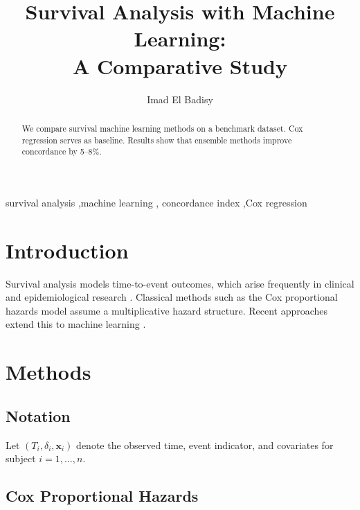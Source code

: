 \documentclass[preprint, 12pt, authoryear]{elsarticle}
\begin{document}
\begin{frontmatter}

\title{Survival Analysis with Machine Learning:\\
       A Comparative Study}

\author[unilab]{Imad El Badisy}


\begin{abstract}
We compare survival machine learning methods on a benchmark
dataset. Cox regression serves as baseline. Results show that
ensemble methods improve concordance by 5--8\%.
\end{abstract}

\begin{keyword}
  survival analysis \sep machine learning \sep
  concordance index \sep Cox regression
\end{keyword}

\end{frontmatter}


\section{Introduction}
\label{sec:intro}

Survival analysis models time-to-event outcomes, which arise
frequently in clinical and epidemiological research
\citep{cox1972}.
Classical methods such as the Cox proportional hazards model
\citep{cox1972} assume a multiplicative hazard structure.
Recent approaches extend this to machine learning
\citep{hastie2009}.

\section{Methods}
\label{sec:methods}

\subsection{Notation}

Let $(T_i, \delta_i, \mathbf{x}_i)$ denote the observed time,
event indicator, and covariates for subject $i = 1,\ldots,n$.

\subsection{Cox Proportional Hazards}
\end{document}
